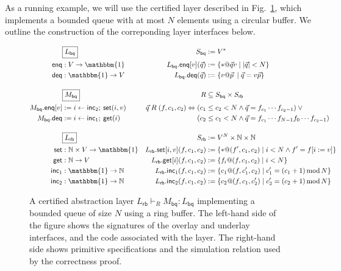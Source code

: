 \documentclass[11pt,oneside,draft]{book}
\theoremstyle{definition}
\newcommand{\kw}[1]{\ensuremath{ \mathsf{#1} }}
\begin{document}
As a running example,
we will use the certified layer
described in Fig.~\ref{fig:cal},
which implements a bounded queue with at most $N$ elements
using a circular buffer.
We outline the construction of
the correponding layer interfaces below.

\begin{figure} %
  \small
    \begin{align*}
      & \fbox{$L_\kw{bq}$} &
        S_\kw{bq} &:= V^* \\
      \kw{enq} &: V \rightarrow \mathbbm{1} &
        L_\kw{bq}.\kw{enq}[v](\vec{q}) &:= \{ * @ \vec{q} v \mid |\vec{q}| < N \} \\
      \kw{deq} &: \mathbbm{1} \rightarrow V &
        L_\kw{bq}.\kw{deq}(\vec{q}) &:= \{ v @ \vec{p} \: \mid \vec{q} = v \vec{p} \}
      \\[1em]
      & \fbox{$M_\kw{bq}$} &
        R &\subseteq S_\kw{bq} \times S_\kw{rb} \\
      M_\kw{bq}.\kw{enq}[v] &:= i \leftarrow \kw{inc}_2 ; \: \kw{set}(i, v) &
        \vec{q} \mathrel{R} (f, c_1, c_2) \Leftrightarrow
           (c_1 &\le c_2 < N \wedge
            \vec{q} = f_{c_1} \cdots f_{c_2-1}) \vee {}
      \\
      M_\kw{bq}.\kw{deq} &:= i \leftarrow \kw{inc}_1 ; \: \kw{get}(i) &
           (c_2 &\le c_1 < N \wedge
            \vec{q} = f_{c_1} \cdots f_{N-1} f_0 \cdots f_{c_2 - 1})
      \\[1em]
      & \fbox{$L_\kw{rb}$} &
        S_\kw{rb} &:= V^N \times \mathbb{N} \times \mathbb{N}
      \\
      \kw{set} &: \mathbb{N} \times V \rightarrow \mathbbm{1} &
        L_\kw{rb}.\kw{set}[i, v](f, c_1, c_2) &:=
        \{ *@(f', c_1, c_2) \mid i < N \wedge f' = f[i := v] \}
      \\
      \kw{get} &: \mathbb{N} \rightarrow V &
        L_\kw{rb}.\kw{get}[i](f, c_1, c_2) &:=
        \{ f_i@(f, c_1, c_2) \mid i < N \}
      \\
      \kw{inc}_1 &: \mathbbm{1} \rightarrow \mathbb{N} &
        L_\kw{rb}.\kw{inc}_1(f, c_1, c_2) &:=
        \{ c_1@(f, c_1', c_2) \mid
           c_1' = (c_1 + 1) \mathop{\mathrm{mod}} N \}
      \\
      \kw{inc}_2 &: \mathbbm{1} \rightarrow \mathbb{N} &
        L_\kw{rb}.\kw{inc}_2(f, c_1, c_2) &:=
        \{ c_2@(f, c_1, c_2') \mid
           c_2' = (c_2 + 1) \mathop{\mathrm{mod}} N \}
    \end{align*}
  \caption[Certified abstraction layer implementing a bounded queue]%
   {A certified abstraction layer
    $L_\kw{rb} \vdash_R M_\kw{bq} : L_\kw{bq}$
    implementing a bounded queue of size $N$
    using a ring buffer.
    The left-hand side of the figure shows
    the signatures of the overlay and underlay interfaces,
    and the code associated with the layer.
    The right-hand side shows primitive specifications
    and the simulation relation used by the correctness proof.}
  \label{fig:cal}
\end{figure}
\end{document}
